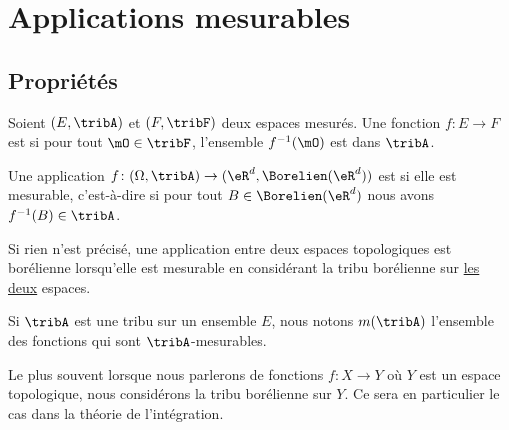 
\section{Applications mesurables}

\subsection{Propriétés}

\begin{definition} \label{DefQKjDSeC}
    Soient \( (E,\tribA)\) et \( (F,\tribF)\) deux espaces mesurés. Une fonction \( f\colon E\to F\) est  si pour tout \( \mO\in \tribF\), l'ensemble \( f^{-1}(\mO)\) est dans \( \tribA\).
\end{definition}

\begin{definition}     \label{DefHHIBooNrpQjs}
    Une application \( f\colon (\Omega,\tribA)\to (\eR^d,\Borelien(\eR^d))\) est  si elle est mesurable, c'est-à-dire si pour tout \( B\in\Borelien(\eR^d)\) nous avons \( f^{-1}(B)\in\tribA\).

    Si rien n'est précisé, une application entre deux espaces topologiques est borélienne lorsqu'elle est mesurable en considérant la tribu borélienne sur \underline{les deux} espaces.
\end{definition}
Si \( \tribA\) est une tribu sur un ensemble \( E\), nous notons \( m(\tribA)\) l'ensemble des fonctions qui sont \( \tribA\)-mesurables.

Le plus souvent lorsque nous parlerons de fonctions \( f\colon X\to Y\) où \( Y\) est un espace topologique, nous considérons la tribu borélienne sur \( Y\). Ce sera en particulier le cas dans la théorie de l'intégration.

